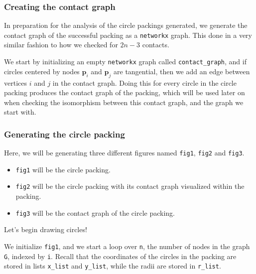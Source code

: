 \subsubsection{Creating the contact graph}

\begin{flushleft}
In preparation for the analysis of the circle packings generated, we generate the contact graph of the successful packing as a \texttt{networkx} graph. This done in a very similar fashion to how we checked for $2n-3$ contacts.
\end{flushleft}

\begin{flushleft}
We start by initializing an empty \texttt{networkx} graph called \texttt{contact\_graph}, and if circles centered by nodes $\textbf{p}_i$ and $\textbf{p}_j$ are tangential, then we add an edge between vertices $i$ and $j$ in the contact graph. Doing this for every circle in the circle packing produces the contact graph of the packing, which will be used later on when checking the isomorphism between this contact graph, and the graph we start with.
\end{flushleft}

\subsubsection{Generating the circle packing}

\begin{flushleft}
Here, we will be generating three different figures named \texttt{fig1}, \texttt{fig2} and \texttt{fig3}. 
\begin{itemize}
    \item \texttt{fig1} will be the circle packing.
    \vspace{-3mm}
    \item \texttt{fig2} will be the circle packing with its contact graph visualized within the packing.
    \vspace{-3mm}
    \item \texttt{fig3} will be the contact graph of the circle packing. 
\end{itemize}

Let's begin drawing circles!
\end{flushleft}

\begin{flushleft}
We initialize \texttt{fig1}, and we start a loop over \texttt{n}, the number of nodes in the graph \texttt{G}, indexed by \texttt{i}. Recall that the coordinates of the circles in the packing are stored in lists \texttt{x\_list} and \texttt{y\_list}, while the radii are stored in \texttt{r\_list}. 
\end{flushleft} 

